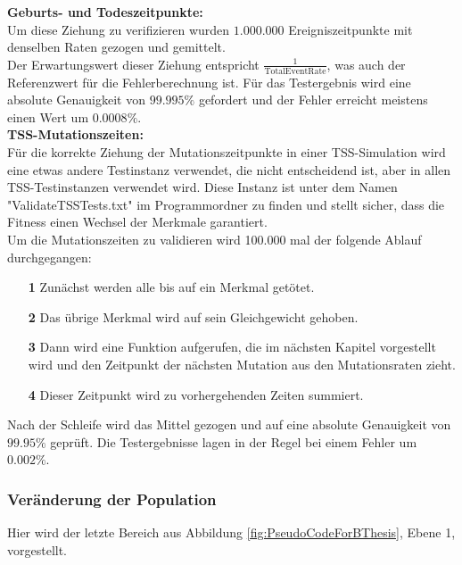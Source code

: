 \documentclass[11pt, a4paper, german]{article}
\theoremstyle{plain}
\begin{document}
	\textbf{Geburts- und Todeszeitpunkte:}\\
	Um diese Ziehung zu verifizieren wurden $ 1.000.000 $ Ereigniszeitpunkte mit denselben Raten gezogen und gemittelt.\\
	Der Erwartungswert dieser Ziehung entspricht $ \frac{1}{\text{TotalEventRate}} $, was auch der Referenzwert für die Fehlerberechnung ist. Für das Testergebnis wird eine absolute Genauigkeit von $ 99.995 \% $ gefordert und der Fehler erreicht meistens einen Wert um $ 0.0008\% $.\\
	
	\textbf{TSS-Mutationszeiten:}\\
	Für die korrekte Ziehung der Mutationszeitpunkte in einer TSS-Simulation wird eine etwas andere Testinstanz verwendet, die nicht entscheidend ist, aber in allen TSS-Testinstanzen verwendet wird. Diese Instanz ist unter dem Namen "{}ValidateTSSTests.txt"{} im Programmordner zu finden und stellt sicher, dass die Fitness einen Wechsel der Merkmale garantiert.\\
	Um die Mutationszeiten zu validieren wird 100.000 mal der folgende Ablauf durchgegangen:
	\begin{itemize}
		\item[\textbf{1}] Zunächst werden alle bis auf ein Merkmal getötet.
		\item[\textbf{2}] Das übrige Merkmal wird auf sein Gleichgewicht gehoben.
		\item[\textbf{3}] Dann wird eine Funktion aufgerufen, die im nächsten Kapitel vorgestellt wird und den Zeitpunkt der nächsten Mutation aus den Mutationsraten zieht.
		\item[\textbf{4}] Dieser Zeitpunkt wird zu vorhergehenden Zeiten summiert.
	\end{itemize}
	Nach der Schleife wird das Mittel gezogen und auf eine absolute Genauigkeit von $ 99.95\% $ geprüft. Die Testergebnisse lagen in der Regel bei einem Fehler um $ 0.002\% $.\\
	
	\subsubsection{Veränderung der Population}
	Hier wird der letzte Bereich aus Abbildung \ref{fig:PseudoCodeForBThesis}, Ebene 1, vorgestellt.\\
	
\end{document}
